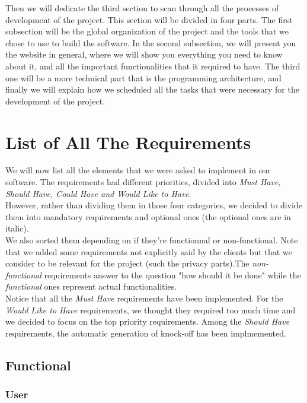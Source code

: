 \documentclass[a4paper, 12pt]{article}
\begin{document}
Then we will dedicate the third section to scan through all the processes of development of the project. This section will be divided in four parts. The first subsection will be the global organization of the project and the tools that we chose to use to build the software. In the second subsection, we will present you the website in general, where we will show you everything you need to know about it, and all the important functionalities that it required to have. The third one will be a more technical part that is the programming architecture, and finally we will explain how we scheduled all the tasks that were necessary for the development of the project.\\

\newpage
\section{List of All The Requirements}
We will now list all the elements that we were asked to implement in our software. The requirements had different priorities, divided into \textit{Must Have, Should Have, Could Have and Would Like to Have}. \\

However, rather than dividing them in those four categories, we decided to divide them into mandatory requirements and optional ones (the optional ones are in italic). \\

We also sorted  them depending on if they're functionnal or non-functional. Note that we added some requirements not explicitly said by the clients but that we consider to be relevant for the project (such the privacy parts).The \textit{non-functional} requirements answer to the question "how should it be done" while the \textit{functional} ones represent actual functionalities.\\

Notice that all the \textit{Must Have} requirements have been implemented. For the \textit{Would Like to Have} requirements, we thought they required too much time and we decided to focus on the top priority requirements. Among the \textit{Should Have} requirements, the automatic generation of knock-off has been implmemented.\\
\subsection*{Functional}

\subsubsection*{User}
	
\end{document}
